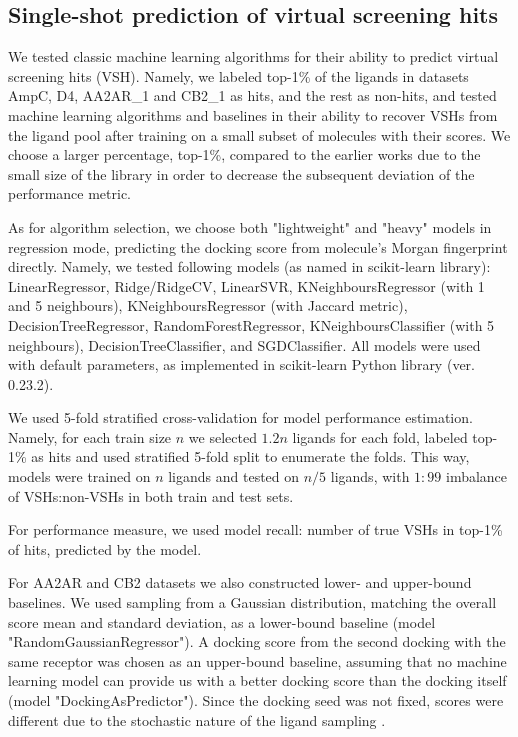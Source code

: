 \subsection{Single-shot prediction of virtual screening hits}
We tested classic machine learning algorithms for their ability to predict virtual screening hits (VSH). Namely, we labeled top-1\% of the ligands in datasets AmpC, D4, AA2AR\_1 and CB2\_1 as hits, and the rest as non-hits, and tested machine learning algorithms and baselines in their ability to recover VSHs from the ligand pool after training on a small subset of molecules with their scores. We choose a larger percentage, top-1\%, compared to the earlier works \cite{Graff2021AcceleratingLearning, logistic_regression, Yang2021_shoichet_active_learning} due to the small size of the library in order to decrease the subsequent deviation of the performance metric.

As for algorithm selection, we choose both "lightweight" and "heavy" models in regression mode, predicting the docking score from molecule's Morgan fingerprint directly. Namely, we tested following models (as named in scikit-learn library): LinearRegressor, Ridge/RidgeCV, LinearSVR, KNeighboursRegressor (with 1 and 5 neighbours), KNeighboursRegressor (with Jaccard metric), DecisionTreeRegressor, RandomForestRegressor, KNeighboursClassifier (with 5 neighbours), DecisionTreeClassifier, and SGDClassifier. All models were used with default parameters, as implemented in scikit-learn Python library \cite{scikit-learn} (ver. 0.23.2).

We used 5-fold stratified cross-validation for model performance estimation. Namely, for each train size $n$ we selected $1.2n$ ligands for each fold, labeled top-1\% as hits and used stratified 5-fold split to enumerate the folds. This way, models were trained on $n$ ligands and tested on $n/5$ ligands, with $1:99$ imbalance of VSHs:non-VSHs in both train and test sets.

For performance measure, we used model recall: number of true VSHs in top-1\% of hits, predicted by the model.

For AA2AR and CB2 datasets we also constructed lower- and upper-bound baselines. We used sampling from a Gaussian distribution, matching the overall score mean and standard deviation, as a lower-bound baseline (model "RandomGaussianRegressor"). A docking score from the second docking with the same receptor was chosen as an upper-bound baseline, assuming that no machine learning model can provide us with a better docking score than the docking itself (model "DockingAsPredictor"). Since the docking seed was not fixed, scores were different due to the stochastic nature of the ligand sampling \cite{abagyan_biased_1994}.

